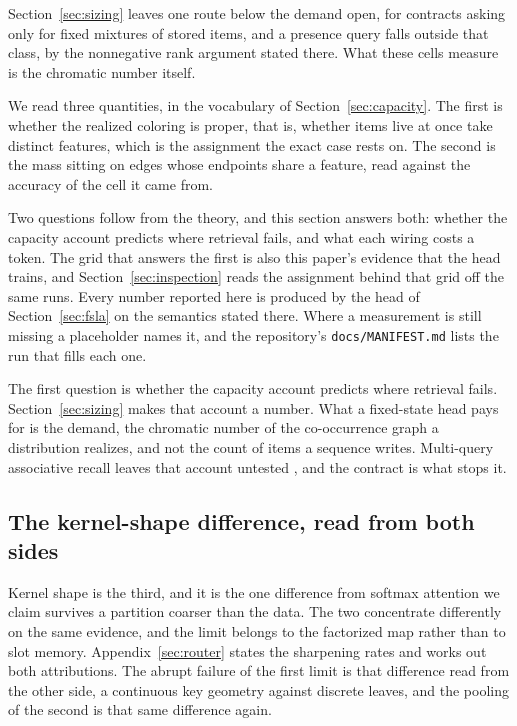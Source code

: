 Section~\ref{sec:sizing} leaves one route below the demand open, for contracts asking only for fixed mixtures of stored items, and a presence query falls outside that class, by the nonnegative rank argument stated there. What these cells measure is the chromatic number itself.

We read three quantities, in the vocabulary of Section~\ref{sec:capacity}. The first is whether the realized coloring is proper, that is, whether items live at once take distinct features, which is the assignment the exact case rests on. The second is the mass sitting on edges whose endpoints share a feature, read against the accuracy of the cell it came from.

Two questions follow from the theory, and this section answers both: whether the capacity account predicts where retrieval fails, and what each wiring costs a token. The grid that answers the first is also this paper's evidence that the head trains, and Section~\ref{sec:inspection} reads the assignment behind that grid off the same runs. Every number reported here is produced by the head of Section~\ref{sec:fsla} on the semantics stated there. Where a measurement is still missing a placeholder names it, and the repository's \texttt{docs/MANIFEST.md} lists the run that fills each one.

The first question is whether the capacity account predicts where retrieval fails. Section~\ref{sec:sizing} makes that account a number. What a fixed-state head pays for is the demand, the chromatic number of the co-occurrence graph a distribution realizes, and not the count of items a sequence writes. Multi-query associative recall leaves that account untested \citep{arora2023zoology}, and the contract is what stops it.

\subsection{The kernel-shape difference, read from both sides}
\label{apd:kernelshape}

Kernel shape is the third, and it is the one difference from softmax attention we claim survives a partition coarser than the data. The two concentrate differently on the same evidence, and the limit belongs to the factorized map rather than to slot memory. Appendix~\ref{sec:router} states the sharpening rates and works out both attributions. The abrupt failure of the first limit is that difference read from the other side, a continuous key geometry against discrete leaves, and the pooling of the second is that same difference again.


